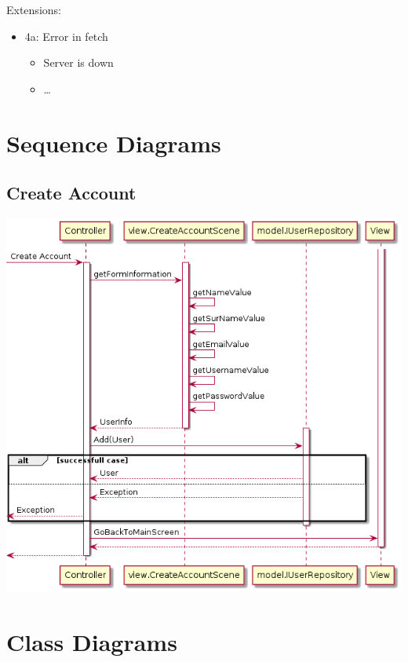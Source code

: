 \documentclass[11pt]{article}
\begin{document}
Extensions:
\begin{itemize}
\item 4a: Error in fetch
\begin{itemize}
\item Server is down
\item \ldots{}
\end{itemize}
\end{itemize}
\section{Sequence Diagrams}
\label{sec:org67c4a84}
\subsection{Create Account}
\label{sec:org7b2c327}
\begin{center}
\includegraphics[width=.9\linewidth]{sequence/CreateAccount.png}
\end{center}

\section{Class Diagrams}
\label{sec:org8514762}
\end{document}
